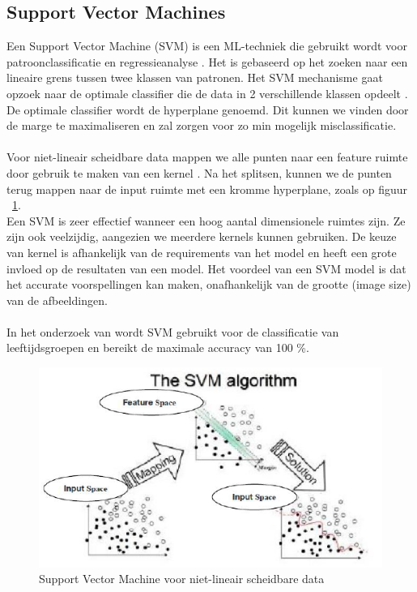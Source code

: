 \subsection{Support Vector Machines} \label{sub:svm}
Een Support Vector Machine (SVM) is een ML-techniek die gebruikt wordt voor patroonclassificatie en regressieanalyse \autocite{Chen2011}. Het is gebaseerd op het zoeken naar een lineaire grens tussen twee klassen van patronen. Het SVM mechanisme gaat opzoek naar de optimale classifier die de data in 2 verschillende klassen opdeelt \autocite{Rustam2018}. De optimale classifier wordt de hyperplane genoemd. Dit kunnen we vinden door de marge te maximaliseren en zal zorgen voor zo min mogelijk misclassificatie. \\
\\
Voor niet-lineair scheidbare data mappen we alle punten naar een feature ruimte door gebruik te maken van een kernel \autocite{Shah2012}. Na het splitsen, kunnen we de punten terug mappen naar de input ruimte met een kromme hyperplane, zoals op figuur {~\ref{fig:svm}}. \\
Een SVM is zeer effectief wanneer een hoog aantal dimensionele ruimtes zijn. Ze zijn ook veelzijdig, aangezien we meerdere kernels kunnen gebruiken. De keuze van kernel is afhankelijk van de requirements van het model en heeft een grote invloed op de resultaten van een model. Het voordeel van een SVM model is dat het accurate voorspellingen kan maken, onafhankelijk van de grootte (image size) van de afbeeldingen. \autocite{Khan2011} \\
\\
In het onderzoek van \textcite{Rustam2018} wordt SVM gebruikt voor de classificatie van leeftijdsgroepen en bereikt de maximale accuracy van 100 \%.
\begin{figure}
    \centering
    \includegraphics{graphics/svm-non-lineair.PNG}
    \caption[SVM]{Support Vector Machine voor niet-lineair scheidbare data
        \label{fig:svm}}
\end{figure}

